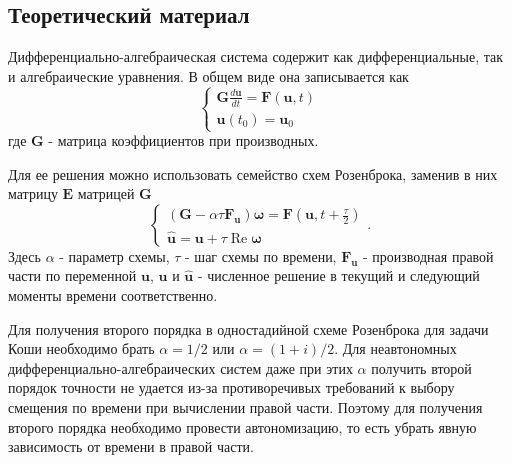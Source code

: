 \chapter{}

\section{Теоретический материал}
Дифференциально-алгебраическая система содержит как дифференциальные, так и алгебраические уравнения. В общем виде она записывается как
\begin{equation} \label{c4eq1}
	\begin{cases}
		\displaystyle \mathbf{G} \frac{d\mathbf{u}}{dt} = \mathbf{F} \left( \mathbf{u}, t \right) \\
		\mathbf{u}(t_0) = \mathbf{u}_0
	\end{cases}
\end{equation}
где $\mathbf{G}$ - матрица коэффициентов при производных. 

Для ее решения можно использовать семейство схем Розенброка, заменив в них матрицу $\mathbf{E}$ матрицей $\mathbf{G}$  
\begin{equation} \label{c4eq2}
	\begin{cases}
		\displaystyle \left( \mathbf{G} - \alpha \tau \mathbf{F_u} \right) \boldsymbol{\omega} = \mathbf{F} \left( \mathbf{u}, t + \frac{\tau}{2} \right) \\
		\mathbf{\hat{u}} = \mathbf{u} + \tau \operatorname{Re} \boldsymbol{\omega}
	\end{cases}.
\end{equation}
Здесь $\alpha$ - параметр схемы, $\tau$ - шаг схемы по времени, $\mathbf{F_u}$ - производная правой части по переменной $\mathbf{u}$, $\mathbf{u}$ и $\mathbf{\hat{u}}$ - численное решение в текущий и следующий моменты времени соответственно.

Для получения второго порядка в одностадийной схеме Розенброка для задачи Коши необходимо брать
$\alpha = 1/2$ или $\alpha = (1+i)/2$. Для неавтономных дифференциально-алгебраических систем даже при этих $\alpha$ получить второй порядок точности не удается из-за противоречивых требований к выбору смещения по времени при вычислении правой части. Поэтому для получения второго порядка необходимо провести автономизацию, то есть убрать явную зависимость от времени в правой части.

